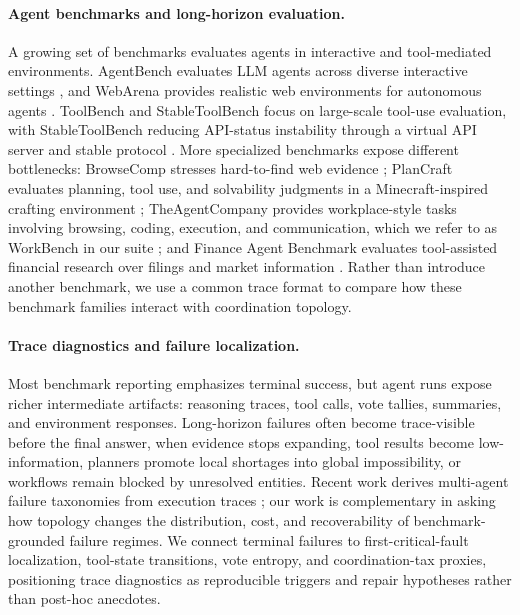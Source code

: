 \documentclass{article}
\theoremstyle{plain}
\theoremstyle{definition}
\theoremstyle{remark}
\begin{document}
\paragraph{Agent benchmarks and long-horizon evaluation.}
A growing set of benchmarks evaluates agents in interactive and tool-mediated environments. AgentBench evaluates LLM agents across diverse interactive settings \cite{agentbench}, and WebArena provides realistic web environments for autonomous agents \cite{webarena}. ToolBench and StableToolBench focus on large-scale tool-use evaluation, with StableToolBench reducing API-status instability through a virtual API server and stable protocol \cite{toolbench,stabletoolbench}. More specialized benchmarks expose different bottlenecks: BrowseComp stresses hard-to-find web evidence \cite{browsecomp}; PlanCraft evaluates planning, tool use, and solvability judgments in a Minecraft-inspired crafting environment \cite{plancraft}; TheAgentCompany provides workplace-style tasks involving browsing, coding, execution, and communication, which we refer to as WorkBench in our suite \cite{theagentcompany}; and Finance Agent Benchmark evaluates tool-assisted financial research over filings and market information \cite{financeagent}. Rather than introduce another benchmark, we use a common trace format to compare how these benchmark families interact with coordination topology.

\paragraph{Trace diagnostics and failure localization.}
Most benchmark reporting emphasizes terminal success, but agent runs expose richer intermediate artifacts: reasoning traces, tool calls, vote tallies, summaries, and environment responses. Long-horizon failures often become trace-visible before the final answer, when evidence stops expanding, tool results become low-information, planners promote local shortages into global impossibility, or workflows remain blocked by unresolved entities. Recent work derives multi-agent failure taxonomies from execution traces \cite{mast}; our work is complementary in asking how topology changes the distribution, cost, and recoverability of benchmark-grounded failure regimes. We connect terminal failures to first-critical-fault localization, tool-state transitions, vote entropy, and coordination-tax proxies, positioning trace diagnostics as reproducible triggers and repair hypotheses rather than post-hoc anecdotes.
\end{document}
